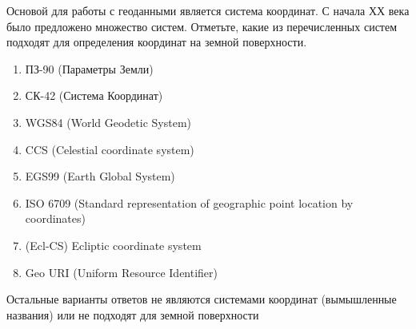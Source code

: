 
Основой для работы с геоданными является система координат. С начала ХХ века было предложено множество систем. Отметьте, какие из перечисленных систем подходят для определения координат на земной поверхности.


\begin{enumerate}
    \item ПЗ-90 (Параметры Земли)
    \item СК-42 (Система Координат)
    \item WGS84 (World Geodetic System)
    \item CCS (Celestial coordinate system)
    \item EGS99 (Earth Global System)
    \item ISO 6709 (Standard representation of geographic point location by coordinates)
    \item (Ecl-CS) Ecliptic coordinate system
    \item Geo URI (Uniform Resource Identifier)
\end{enumerate}


\explanationSection

Остальные варианты ответов не являются системами координат (вымышленные названия) или не подходят для земной поверхности